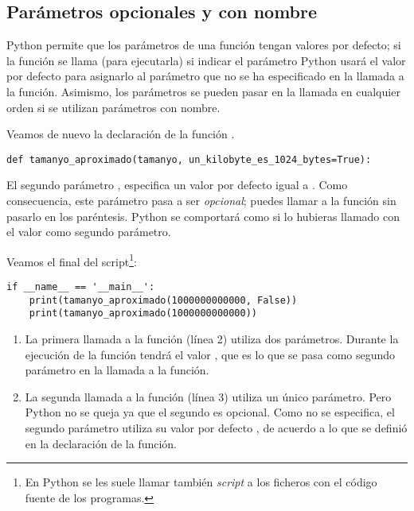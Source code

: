 \subsection{Parámetros opcionales y con nombre}

Python permite que los parámetros de una función tengan valores por defecto; si la función se llama (para ejecutarla) si indicar el parámetro Python usará el valor por defecto para asignarlo al parámetro que no se ha especificado en la llamada a la función. Asimismo, los parámetros se pueden pasar en la llamada en cualquier orden si se utilizan parámetros con nombre.

Veamos de nuevo la declaración de la función .

\begin{lstlisting}
def tamanyo_aproximado(tamanyo, un_kilobyte_es_1024_bytes=True):
\end{lstlisting}

El segundo parámetro , especifica un valor por defecto igual a . Como consecuencia, este parámetro pasa a ser \emph{opcional}; puedes llamar a la función sin pasarlo en los paréntesis. Python se comportará como si lo hubieras llamado con el valor  como segundo parámetro.

Veamos el final del script\footnote{En Python se les suele llamar también \emph{script} a los ficheros con el código fuente de los programas.}:


\begin{lstlisting}
if __name__ == '__main__':
    print(tamanyo_aproximado(1000000000000, False))
    print(tamanyo_aproximado(1000000000000))
\end{lstlisting}

\begin{enumerate}
\item La primera llamada a la función (línea 2) utiliza dos parámetros. Durante la ejecución de la función   tendrá el valor , que es lo que se pasa como segundo parámetro en la llamada a la función.

\item La segunda llamada a la función (línea 3) utiliza un único parámetro. Pero Python no se queja ya que el segundo es opcional. Como no se especifica, el segundo parámetro utiliza su valor por defecto , de acuerdo a lo que se definió en la declaración de la función.
\end{enumerate}

